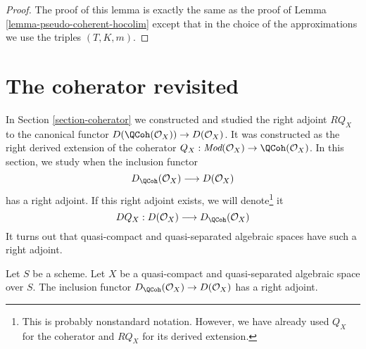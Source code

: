 \begin{proof}
The proof of this lemma is exactly the same as the proof of
Lemma \ref{lemma-pseudo-coherent-hocolim}
except that in the choice of the approximations we use
the triples $(T, K, m)$.
\end{proof}











\section{The coherator revisited}
\label{section-better-coherator}

\noindent
In Section \ref{section-coherator} we constructed and studied
the right adjoint $RQ_X$ to the canonical functor
$D(\QCoh(\mathcal{O}_X)) \to D(\mathcal{O}_X)$.
It was constructed as the right derived extension of the coherator
$Q_X : \textit{Mod}(\mathcal{O}_X) \to \QCoh(\mathcal{O}_X)$.
In this section, we study when the inclusion functor
$$
D_\QCoh(\mathcal{O}_X) \longrightarrow D(\mathcal{O}_X)
$$
has a right adjoint. If this right adjoint exists, we will
denote\footnote{This is probably nonstandard notation. However, we have already
used $Q_X$ for the coherator and $RQ_X$ for its derived extension.} it
$$
DQ_X :
D(\mathcal{O}_X) \longrightarrow D_\QCoh(\mathcal{O}_X)
$$
It turns out that quasi-compact and quasi-separated
algebraic spaces have such a right adjoint.

\begin{lemma}
\label{lemma-better-coherator}
Let $S$ be a scheme.
Let $X$ be a quasi-compact and quasi-separated algebraic space over $S$.
The inclusion functor $D_\QCoh(\mathcal{O}_X) \to D(\mathcal{O}_X)$
has a right adjoint.
\end{lemma}


